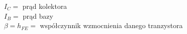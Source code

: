 \documentclass[varwidth]{standalone}
\begin{document}
\begin{center}\scalebox{2}{$I_C = \beta · I_B$}\end{center}

$I_C = $ prąd kolektora\\
$I_B = $ prąd bazy\\
$\beta = h_{FE} = $ współczynnik wzmocnienia danego tranzystora

\vspace{0.7cm}
\begin{center}\scalebox{2}{$I_E = I_C + I_B$}\end{center}
\end{document}

